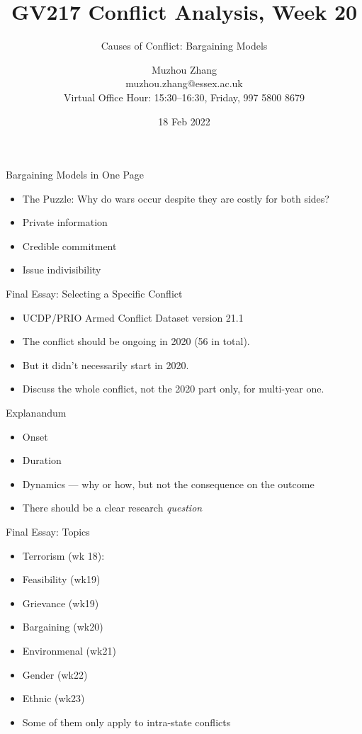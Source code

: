 \documentclass[handout]{beamer}
\title{GV217 Conflict Analysis, Week 20}
\subtitle{Causes of Conflict: Bargaining Models}
\author{Muzhou Zhang\\ muzhou.zhang@essex.ac.uk\\ Virtual Office Hour: 15:30--16:30, Friday, 997 5800 8679}
\date{18 Feb 2022}
\begin{document}
\maketitle
{}

\begin{frame}{Bargaining Models in One Page}
    \begin{itemize}
        \pause\item The Puzzle: Why do wars occur despite they are costly for both sides?
        \pause\item Private information
        \pause\item Credible commitment
        \pause\item Issue indivisibility
    \end{itemize}
\end{frame}

\begin{frame}{Final Essay: Selecting a Specific Conflict}
    \begin{itemize}
        \pause\item UCDP/PRIO Armed Conflict Dataset version 21.1
        \pause\item The conflict should be ongoing in 2020 (56 in total).
        \pause\item But it didn't necessarily start in 2020.
        \pause\item Discuss the whole conflict, not the 2020 part only, for multi-year one. 
    \end{itemize}
\end{frame}

\begin{frame}{Explanandum}
    \begin{itemize}
        \pause\item Onset
        \pause\item Duration
        \pause\item Dynamics --- why or how, but not the consequence on the outcome
        \pause\item There should be a clear research \emph{question}
    \end{itemize}
\end{frame}

\begin{frame}{Final Essay: Topics}
    \begin{itemize}
        \pause\item Terrorism (wk 18): 
        \pause\item Feasibility (wk19)
        \pause\item Grievance (wk19)
        \pause\item Bargaining (wk20)
        \pause\item Environmenal (wk21)
        \pause\item Gender (wk22)
        \pause\item Ethnic (wk23)
        \pause\item Some of them only apply to intra-state conflicts
    \end{itemize}
\end{frame}
\end{document}
